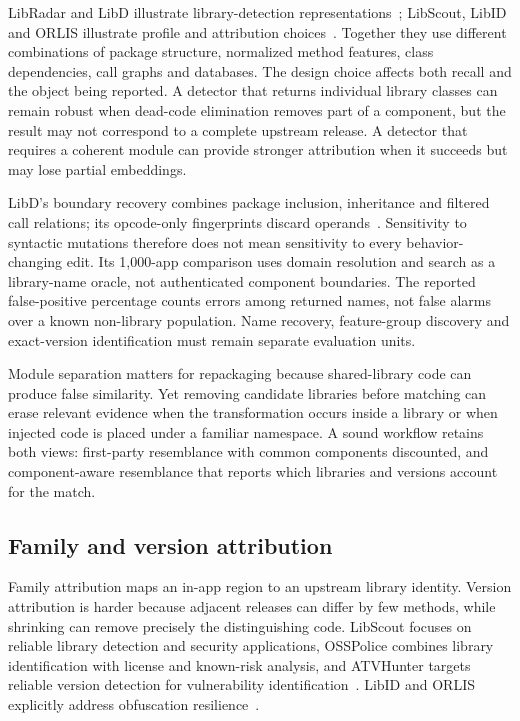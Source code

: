 LibRadar and LibD illustrate library-detection representations~\cite{libradar,libd}; LibScout, LibID and ORLIS illustrate profile and attribution choices~\cite{libscout,libid,orlis}. Together they use different combinations of package structure, normalized method features, class dependencies, call graphs and databases. The design choice affects both recall and the object being reported. A detector that returns individual library classes can remain robust when dead-code elimination removes part of a component, but the result may not correspond to a complete upstream release. A detector that requires a coherent module can provide stronger attribution when it succeeds but may lose partial embeddings.

LibD's boundary recovery combines package inclusion, inheritance and filtered call relations; its opcode-only fingerprints discard operands~\cite{libd}. Sensitivity to syntactic mutations therefore does not mean sensitivity to every behavior-changing edit. Its 1,000-app comparison uses domain resolution and search as a library-name oracle, not authenticated component boundaries. The reported false-positive percentage counts errors among returned names, not false alarms over a known non-library population. Name recovery, feature-group discovery and exact-version identification must remain separate evaluation units.

Module separation matters for repackaging because shared-library code can produce false similarity. Yet removing candidate libraries before matching can erase relevant evidence when the transformation occurs inside a library or when injected code is placed under a familiar namespace. A sound workflow retains both views: first-party resemblance with common components discounted, and component-aware resemblance that reports which libraries and versions account for the match.

\subsection{Family and version attribution}

Family attribution maps an in-app region to an upstream library identity. Version attribution is harder because adjacent releases can differ by few methods, while shrinking can remove precisely the distinguishing code. LibScout focuses on reliable library detection and security applications, OSSPolice combines library identification with license and known-risk analysis, and ATVHunter targets reliable version detection for vulnerability identification~\cite{libscout,osspolice,atvhunter}. LibID and ORLIS explicitly address obfuscation resilience~\cite{libid,orlis}.

